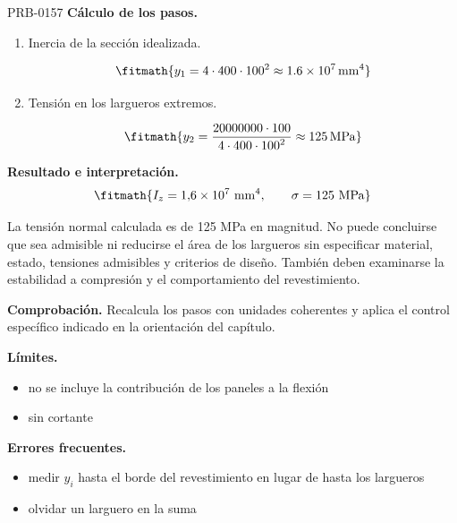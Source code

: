 \begin{studiumworked}{PRB-0157}
\textbf{Cálculo de los pasos.}

\begin{enumerate}

\item Inercia de la sección idealizada.

\[\fitmath{y_{1}=4\cdot 400\cdot {100}^{2}\approx 1.6\times10^{7}\,\mathrm{mm^{4}}}\]

\item Tensión en los largueros extremos.

\[\fitmath{y_{2}=\frac{20000000\cdot 100}{4\cdot 400\cdot {100}^{2}}\approx 125\,\mathrm{MPa}}\]

\end{enumerate}

\textbf{Resultado e interpretación.}\[\fitmath{I_z = 1{,}6\times 10^{7}\ \mathrm{mm}^{4},\qquad \sigma = 125\ \mathrm{MPa}}\]

La tensión normal calculada es de 125 MPa en magnitud. No puede concluirse que sea admisible ni reducirse el área de los largueros sin especificar material, estado, tensiones admisibles y criterios de diseño. También deben examinarse la estabilidad a compresión y el comportamiento del revestimiento.

\par\textbf{Comprobación.} Recalcula los pasos con unidades coherentes y aplica el control específico indicado en la orientación del capítulo.

\textbf{Límites.}\begin{itemize}\item no se incluye la contribución de los paneles a la flexión
\item sin cortante\end{itemize}

\textbf{Errores frecuentes.}\begin{itemize}\item medir $y_i$ hasta el borde del revestimiento en lugar de hasta los largueros
\item olvidar un larguero en la suma\end{itemize}

\end{studiumworked}

\Needspace{.3\textheight}

